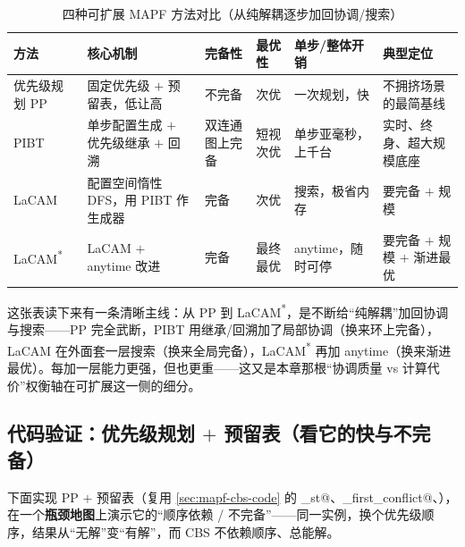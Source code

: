 \begin{table}[H]\centering\small
\caption{四种可扩展 MAPF 方法对比（从纯解耦逐步加回协调/搜索）}
\label{tab:mapf-scalable-compare}
\begin{tabular}{llllll}
\toprule
方法 & 核心机制 & 完备性 & 最优性 & 单步/整体开销 & 典型定位 \\
\midrule
优先级规划 PP & 固定优先级 $+$ 预留表，低让高 & 不完备 & 次优 & 一次规划，快 & 不拥挤场景的最简基线 \\
PIBT & 单步配置生成 $+$ 优先级继承 $+$ 回溯 & 双连通图上完备 & 短视次优 & 单步亚毫秒，上千台 & 实时、终身、超大规模底座 \\
LaCAM & 配置空间惰性 DFS，用 PIBT 作生成器 & 完备 & 次优 & 搜索，极省内存 & 要完备 $+$ 规模 \\
LaCAM\textsuperscript{*} & LaCAM $+$ anytime 改进 & 完备 & 最终最优 & anytime，随时可停 & 要完备 $+$ 规模 $+$ 渐进最优 \\
\bottomrule
\end{tabular}
\end{table}

这张表读下来有一条清晰主线：从 PP 到 LaCAM\textsuperscript{*}，是不断给“纯解耦”加回协调与搜索——PP 完全武断，PIBT 用继承/回溯加了局部协调（换来环上完备），LaCAM 在外面套一层搜索（换来全局完备），LaCAM\textsuperscript{*} 再加 anytime（换来渐进最优）。每加一层能力更强，但也更重——这又是本章那根“协调质量 vs 计算代价”权衡轴在可扩展这一侧的细分。

\subsection{代码验证：优先级规划 $+$ 预留表（看它的快与不完备）}
\label{sec:mapf-scalable-code}

下面实现 PP $+$ 预留表（复用 \cref{sec:mapf-cbs-code} 的 \verb@astar_st@、\verb@find_first_conflict@、\verb@soc@），在一个\textbf{瓶颈地图}上演示它的“顺序依赖 / 不完备”——同一实例，换个优先级顺序，结果从“无解”变“有解”，而 CBS 不依赖顺序、总能解。

